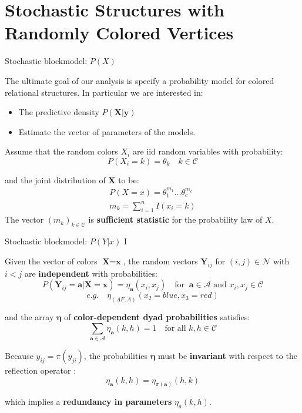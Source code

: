 \documentclass[aspectratio=169,xcolor=dvipsnames]{beamer}
\newcommand{\veca}{\boldsymbol{a}}
\newcommand{\setn}{\mathcal{N}}
\newcommand{\seta}{\mathcal{A}}
\newcommand{\setc}{\mathcal{C}}
\newcommand{\vecx}{\textbf{x}}
\newcommand{\vecy}{\textbf{y}}
\newcommand{\matx}{\textbf{X}}
\newcommand{\maty}{\textbf{Y}}
\newcommand{\veceta}{\boldsymbol{\eta}}
\begin{document}
\section{Stochastic Structures with Randomly Colored Vertices}
\begin{frame}{Stochastic blockmodel: $P(X)$ }

The ultimate goal of our analysis is specify a probability model for colored relational structures. In particular we are interested in:
\begin{itemize}
    \item The predictive density $P(\matx|\vecy)$
    \item Estimate the vector of parameters of the models.
\end{itemize}

Assume that the random colors $X_i$ are iid random variables with probability:
    $$ P(X_i=k)=\theta_k \quad k \in \setc $$

and the joint distribution of $\matx$ to be:
\begin{gather*}
    P(X=x) = \theta_1^{m_1} \dots \theta_c^{m_c}  \\
    m_k = \sum ^n _{i=1} I(x_i = k)
\end{gather*}
The vector $(m_k)_{k \in \setc}$ is \textbf{sufficient statistic} for the probability law of $X$.
    
\end{frame}
\begin{frame}{Stochastic blockmodel: $P(Y|x)$  I}

Given the vector of colors $\matx = \vecx$, the random vectors $\maty_{ij}$ for $(i,j) \in \setn$ with $i <j$ are \textbf{independent} with probabilities:
$$
P(\maty_{ij}=\veca| \matx = \vecx) = \eta_{\veca}(x_i, x_j) \quad \text{for } \ \veca \in \seta \text{ and } x_i, x_j \in \setc
$$  \vspace{-15pt}
$$
e.g. \quad \eta_{(AF,A)}(x_2=blue, x_3=red)
$$

and the array $\veceta$ of \textbf{color-dependent dyad probabilities} satisfies: 
$$
\sum_{\veca \in \seta} \eta_{\veca}(k,h) = 1 \quad \text{for all } k,h \in \setc
$$

Because $y_{ij}=\pi(y_{ji})$, the probabilities $\veceta$ must be \textbf{invariant} with respect to the reflection operator :
$$
\eta_{\veca}(k,h) = \eta_{\pi(\veca)}(h,k)
$$

\vspace{5pt}
which implies a \textbf{redundancy in parameters} $\eta_a(k,h)$.
\end{frame}
\end{document}
